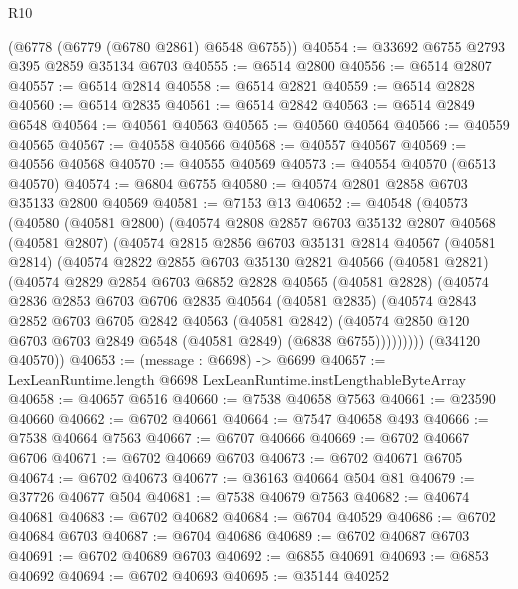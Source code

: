 \begin{lexlean}{R10}
\begin{coremodule}
    (@6778 (@6779 (@6780 @2861) @6548 @6755))
@40554 := @33692 @6755 @2793 @395 @2859 @35134 @6703
@40555 := @6514 @2800
@40556 := @6514 @2807
@40557 := @6514 @2814
@40558 := @6514 @2821
@40559 := @6514 @2828
@40560 := @6514 @2835
@40561 := @6514 @2842
@40563 := @6514 @2849 @6548
@40564 := @40561 @40563
@40565 := @40560 @40564
@40566 := @40559 @40565
@40567 := @40558 @40566
@40568 := @40557 @40567
@40569 := @40556 @40568
@40570 := @40555 @40569
@40573 := @40554 @40570 (@6513 @40570)
@40574 := @6804 @6755
@40580 := @40574 @2801 @2858 @6703 @35133 @2800 @40569
@40581 := @7153 @13
@40652 := @40548
    (@40573
      (@40580
        (@40581 @2800)
        (@40574
          @2808
          @2857
          @6703
          @35132
          @2807
          @40568
          (@40581 @2807)
          (@40574
            @2815
            @2856
            @6703
            @35131
            @2814
            @40567
            (@40581 @2814)
            (@40574
              @2822
              @2855
              @6703
              @35130
              @2821
              @40566
              (@40581 @2821)
              (@40574
                @2829
                @2854
                @6703
                @6852
                @2828
                @40565
                (@40581 @2828)
                (@40574
                  @2836
                  @2853
                  @6703
                  @6706
                  @2835
                  @40564
                  (@40581 @2835)
                  (@40574
                    @2843
                    @2852
                    @6703
                    @6705
                    @2842
                    @40563
                    (@40581 @2842)
                    (@40574 @2850 @120 @6703 @6703 @2849 @6548 (@40581 @2849) (@6838 @6755)))))))))
      (@34120 @40570))
@40653 := (message : @6698) -> @6699
@40657 := LexLeanRuntime.length @6698 LexLeanRuntime.instLengthableByteArray
@40658 := @40657 @6516
@40660 := @7538 @40658 @7563
@40661 := @23590 @40660
@40662 := @6702 @40661
@40664 := @7547 @40658 @493
@40666 := @7538 @40664 @7563
@40667 := @6707 @40666
@40669 := @6702 @40667 @6706
@40671 := @6702 @40669 @6703
@40673 := @6702 @40671 @6705
@40674 := @6702 @40673
@40677 := @36163 @40664 @504 @81
@40679 := @37726 @40677 @504
@40681 := @7538 @40679 @7563
@40682 := @40674 @40681
@40683 := @6702 @40682
@40684 := @6704 @40529
@40686 := @6702 @40684 @6703
@40687 := @6704 @40686
@40689 := @6702 @40687 @6703
@40691 := @6702 @40689 @6703
@40692 := @6855 @40691
@40693 := @6853 @40692
@40694 := @6702 @40693
@40695 := @35144 @40252

\end{coremodule}
\end{lexlean}
